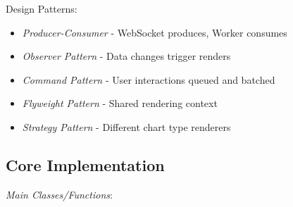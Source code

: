 \documentclass[11pt]{article}
\begin{document}
Design Patterns:

\begin{itemize}
\item \emph{Producer-Consumer} - WebSocket produces, Worker consumes
\item \emph{Observer Pattern} - Data changes trigger renders
\item \emph{Command Pattern} - User interactions queued and batched
\item \emph{Flyweight Pattern} - Shared rendering context
\item \emph{Strategy Pattern} - Different chart type renderers
\end{itemize}
\subsection{Core Implementation}
\label{sec:org3a94f39}

\emph{Main Classes/Functions}:
\end{document}
